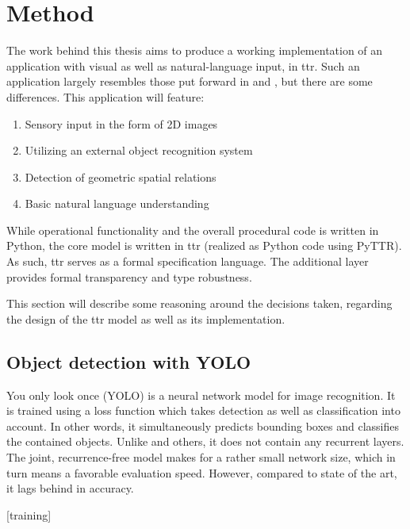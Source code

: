 \section{Method}
\label{sec:method}

The work behind this thesis aims to produce a working implementation of an application with visual as well as natural-language input, in \gls{ttr}.
Such an application largely resembles those put forward in \cite{lspc} and \cite{ttrspat}, but there are some differences.
This application will feature:

\begin{enumerate}
\item Sensory input in the form of 2D images
\item Utilizing an external object recognition system
\item Detection of geometric spatial relations
\item Basic natural language understanding
\end{enumerate}

While operational functionality and the overall procedural code is written in Python, the core model is written in \gls{ttr} (realized as Python code using PyTTR).
As such, \gls{ttr} serves as a formal specification language.
The additional layer provides formal transparency and type robustness.

This section will describe some reasoning around the decisions taken, regarding the design of the \gls{ttr} model as well as its implementation.



\subsection{Object detection with YOLO}

You only look once (YOLO) \citep{RedmonYouOnlyLook2015} is a neural network model for image recognition.
It is trained using a loss function which takes detection as well as classification into account.
In other words, it simultaneously predicts bounding boxes and classifies the contained objects.
Unlike \cite{HeMaskRCNN2017} and others, it does not contain any recurrent layers.
The joint, recurrence-free model makes for a rather small network size, which in turn means a favorable evaluation speed.
However, compared to state of the art, it lags behind in accuracy.

[training]

